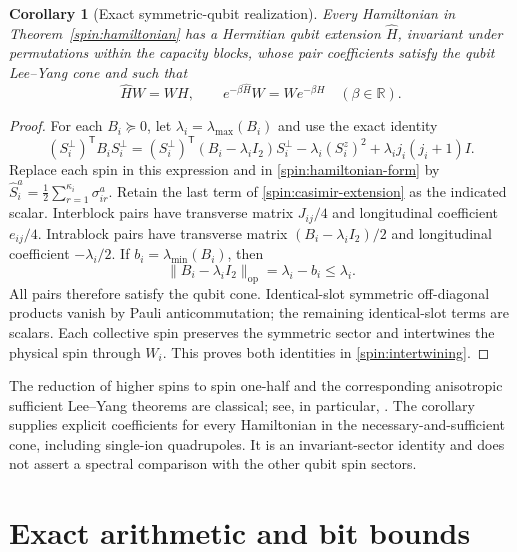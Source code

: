 \documentclass[reqno]{amsart}
\newtheorem{corollary}[theorem]{Corollary}
\theoremstyle{definition}
\theoremstyle{remark}
\newcommand{\R}{\mathbb R}
\begin{document}
\begin{corollary}[Exact symmetric-qubit realization]\label{spin:qubit-realization}
Every Hamiltonian in Theorem~\ref{spin:hamiltonian} has a Hermitian qubit
extension $\widehat H$, invariant under permutations within the capacity
blocks, whose pair coefficients satisfy the qubit Lee--Yang cone and such
that
\begin{equation}\label{spin:intertwining}
 \widehat HW=WH,\qquad e^{-\beta\widehat H}W=We^{-\beta H}
 \quad(\beta\in\R).
\end{equation}
\end{corollary}

\begin{proof}
For each $B_i\succeq0$, let $\lambda_i=\lambda_{\max}(B_i)$ and use
the exact identity
\begin{equation}\label{spin:casimir-extension}
 (S_i^\perp)^{\mathsf T}B_iS_i^\perp
 =(S_i^\perp)^{\mathsf T}(B_i-\lambda_iI_2)S_i^\perp
   -\lambda_i(S_i^z)^2+\lambda_i j_i(j_i+1)I.
\end{equation}
Replace each spin in this expression and in
\eqref{spin:hamiltonian-form} by
$\widehat S_i^a=\frac12\sum_{r=1}^{\kappa_i}\sigma_{ir}^a$.
Retain the last term of \eqref{spin:casimir-extension} as the indicated
scalar.  Interblock pairs have transverse matrix $J_{ij}/4$ and
longitudinal coefficient $e_{ij}/4$.  Intrablock pairs have transverse
matrix $(B_i-\lambda_iI_2)/2$ and longitudinal coefficient
$-\lambda_i/2$.  If $b_i=\lambda_{\min}(B_i)$, then
\[
 \|B_i-\lambda_iI_2\|_{\mathrm{op}}=\lambda_i-b_i\leq\lambda_i.
\]
All pairs therefore satisfy the qubit cone.  Identical-slot symmetric
off-diagonal products vanish by Pauli anticommutation; the remaining
identical-slot terms are scalars.  Each collective spin preserves the
symmetric sector and intertwines the physical spin through $W_i$.
This proves both identities in \eqref{spin:intertwining}.
\end{proof}

The reduction of higher spins to spin one-half and the corresponding
anisotropic sufficient Lee--Yang theorems are classical; see, in
particular, \cite[Theorem~2 and equations~(2.38)--(2.44)]{SuzukiFisher71}.
The corollary supplies explicit coefficients
for every Hamiltonian in the necessary-and-sufficient cone, including
single-ion quadrupoles.  It is an invariant-sector identity and does not
assert a spectral comparison with the other qubit spin sectors.



\appendix
\section{Exact arithmetic and bit bounds}\label{arith:section}
\end{document}
